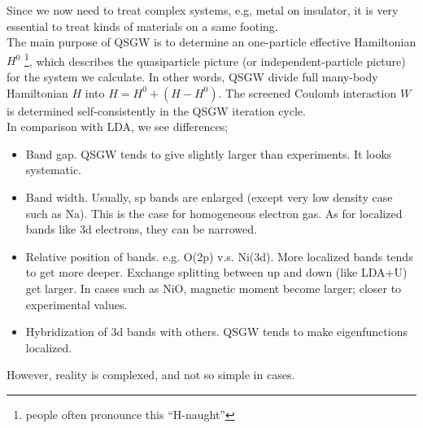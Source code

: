\documentclass[a4paper,10pt,epsf,fleqn]{article}
\begin{document}
Since we now need to treat complex systems, e.g, metal on
insulator, it is very essential to treat kinds of materials
on a same footing.\\

The main purpose of QSGW is to determine an one-particle effective
Hamiltonian $H^0$  \footnote{people often pronounce this “H-naught”},
which describes the quasiparticle picture (or independent-particle
picture) for the system we calculate.
In other words, QSGW divide full many-body Hamiltonian $H$ into
$H=H^0+(H-H^0)$.
The screened Coulomb interaction $W$ is determined self-consistently in
the QSGW iteration cycle.\\

\noindent In comparison with LDA, we see differences;
\begin{itemize}
\item
Band gap. QSGW tends to give slightly larger than experiments. It looks systematic.
\item
Band width. Usually, sp bands are enlarged 
     (except very low density case such as Na).
     This is the case for homogeneous electron gas.
     As for localized bands like 3d electrons, they can be narrowed.
\item
Relative position of bands. e.g. O(2p) v.s. Ni(3d).
More localized bands tends to get more deeper.
Exchange splitting between up and down (like LDA+U) get larger.
In cases such as NiO, magnetic moment become larger; closer to
experimental values.
\item
Hybridization of 3d bands with others. 
QSGW tends to make eigenfunctions localized.
\end{itemize}

However, reality is complexed, and not so simple in cases.


\end{document}
